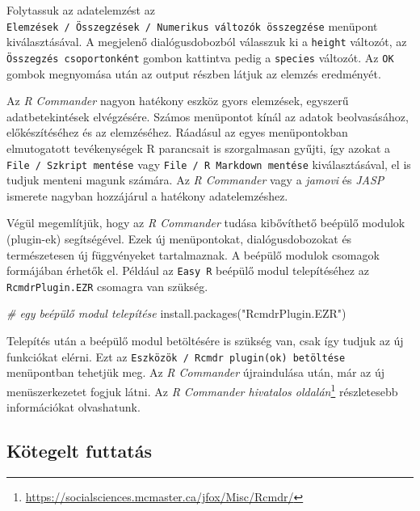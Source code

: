\documentclass[
]{book}
\newenvironment{Shaded}{\begin{snugshade}}{\end{snugshade}}
\newcommand{\CommentTok}[1]{\textcolor[rgb]{0.56,0.35,0.01}{\textit{#1}}}
\newcommand{\FunctionTok}[1]{\textcolor[rgb]{0.00,0.00,0.00}{#1}}
\newcommand{\NormalTok}[1]{#1}
\newcommand{\StringTok}[1]{\textcolor[rgb]{0.31,0.60,0.02}{#1}}
\DeclareRobustCommand{\href}[2]{#2\footnote{\url{#1}}}
\renewcommand{\href}[2]{#2\footnote{\url{#1}}}
\begin{document}
Folytassuk az adatelemzést az \texttt{Elemzések\ /\ Összegzések\ /\ Numerikus\ változók\ összegzése} menüpont kiválasztásával. A megjelenő dialógusdobozból válasszuk ki a \texttt{height} változót, az \texttt{Összegzés\ csoportonként} gombon kattintva pedig a \texttt{species} változót. Az \texttt{OK} gombok megnyomása után az output részben látjuk az elemzés eredményét.

Az \emph{R Commander} nagyon hatékony eszköz gyors elemzések, egyszerű adatbetekintések elvégzésére. Számos menüpontot kínál az adatok beolvasásához, előkészítéséhez és az elemzéséhez. Ráadásul az egyes menüpontokban elmutogatott tevékenységek R parancsait is szorgalmasan gyűjti, így azokat a \texttt{File\ /\ Szkript\ mentése} vagy \texttt{File\ /\ R\ Markdown\ mentése} kiválasztásával, el is tudjuk menteni magunk számára. Az \emph{R Commander} vagy a \emph{jamovi} és \emph{JASP} ismerete nagyban hozzájárul a hatékony adatelemzéshez.

Végül megemlítjük, hogy az \emph{R Commander} tudása kibővíthető beépülő modulok (plugin-ek) segítségével. Ezek új menüpontokat, dialógusdobozokat és természetesen új függvényeket tartalmaznak. A beépülő modulok csomagok formájában érhetők el. Például az \texttt{Easy\ R} beépülő modul telepítéséhez az \texttt{RcmdrPlugin.EZR} csomagra van szükség.

\begin{Shaded}
\begin{Highlighting}[]
\CommentTok{\# egy beépülő modul telepítése }
\FunctionTok{install.packages}\NormalTok{(}\StringTok{"RcmdrPlugin.EZR"}\NormalTok{)}
\end{Highlighting}
\end{Shaded}

Telepítés után a beépülő modul betöltésére is szükség van, csak így tudjuk az új funkciókat elérni. Ezt az \texttt{Eszközök\ /\ Rcmdr\ plugin(ok)\ betöltése} menüpontban tehetjük meg. Az \emph{R Commander} újraindulása után, már az új menüszerkezetet fogjuk látni. Az \href{https://socialsciences.mcmaster.ca/jfox/Misc/Rcmdr/}{\emph{R Commander hivatalos oldalán}} részletesebb információkat olvashatunk.

\hypertarget{kuxf6tegelt-futtatuxe1s}{%
\subsection{Kötegelt futtatás}\label{kuxf6tegelt-futtatuxe1s}}
\end{document}
